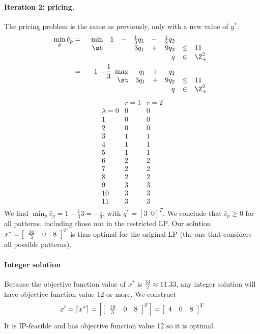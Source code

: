 \paragraph{Iteration 2: pricing. }
The pricing problem is the same as previously, only with
a new value of $y^*$:
\begin{eqnarray*}
\min_p \bar c_p & = &
\begin{array}[t]{rrcrcrcl}
\min & 1 & - & \frac{1}{3} q_1 & - & \frac{1}{3} q_2 &      &    \\
\st  &   &   &           3 q_1 & + &           9 q_2 & \leq & 11 \\
     &   &   &                 &   &             q   & \in  & \Z^2_+
\end{array} \\
& = & 1 - \frac{1}{3}
\begin{array}[t]{rrcrcl}
\max &   q_1 & + &   q_2 &      &    \\
\st  & 3 q_1 & + & 9 q_2 & \leq & 11 \\
     &       &   &   q   & \in  & \Z^2_+
\end{array}
\end{eqnarray*}
\[
\begin{array}{r|rr}
 & r=1 & r=2 \\
\hline
\lambda =
 0 & 0 & 0 \\
 1 & 0 & 0 \\
 2 & 0 & 0 \\
 3 & 1 & 1 \\
 4 & 1 & 1 \\
 5 & 1 & 1 \\
 6 & 2 & 2 \\
 7 & 2 & 2 \\
 8 & 2 & 2 \\
 9 & 3 & 3 \\
 10 & 3 & 3 \\
 11 & 3 & 3 \\
\end{array}
\]
We find $\min_p \bar c_p = 1 - \frac{1}{3} 3 = -\frac{1}{3}$,
with $q^* = [ 3 \;\; 0 ]^T$. We conclude that $\bar c_p \geq 0$
for all patterns, including those not in the restricted LP.
Our solution $x^* = \vmat{ccc}{\frac{10}{3} & 0 & 8}^T$
is thus optimal for the original LP (the one that considers all
possible patterns).

\paragraph{Integer solution}
Because the objective function value of $x^*$ is
$\frac{34}{2} \approx 11.33$,
any integer solution will have objective function value
12 or more.
We construct
\[
x' = \ceil{x^*} = \left\lceil \vmat{ccc}{\frac{10}{3} & 0 & 8}^T \right\rceil
 = \vmat{ccc}{4 & 0 & 8}^T
\]
It is IP-feasible and has objective function value 12 so it is optimal.

